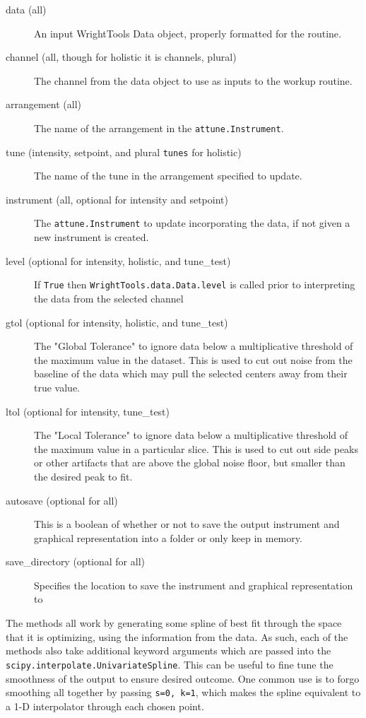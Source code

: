 \begin{description}
\item[data (all)]
An input WrightTools Data object, properly formatted for the routine.
\item[channel (all, though for holistic it is channels, plural)]
The channel from the data object to use as inputs to the workup routine.
\item[arrangement (all)]
The name of the arrangement in the
\texttt{attune.Instrument}.
\item[tune (intensity, setpoint, and plural \texttt{tunes} for
holistic)]
The name of the tune in the arrangement specified to update.
\item[instrument (all, optional for intensity and setpoint)]
The \texttt{attune.Instrument} to update incorporating
the data, if not given a new instrument is created.
\item[level (optional for intensity, holistic, and tune\_test)]
If \texttt{True} then \texttt{WrightTools.data.Data.level} is called
prior to interpreting the data from the selected channel
\item[gtol (optional for intensity, holistic, and tune\_test)]
The "Global Tolerance" to ignore data below a multiplicative threshold
of the maximum value in the dataset. This is used to cut out noise from
the baseline of the data which may pull the selected centers away from
their true value.
\item[ltol (optional for intensity, tune\_test)]
The "Local Tolerance" to ignore data below a multiplicative threshold of
the maximum value in a particular slice. This is used to cut out side
peaks or other artifacts that are above the global noise floor, but
smaller than the desired peak to fit.
\item[autosave (optional for all)]
This is a boolean of whether or not to save the output instrument and
graphical representation into a folder or only keep in memory.
\item[save\_directory (optional for all)]
Specifies the location to save the instrument and graphical
representation to
\end{description}

The methods all work by generating some spline of best fit through the
space that it is optimizing, using the information from the data. As
such, each of the methods also take additional keyword arguments which
are passed into the \texttt{scipy.interpolate.UnivariateSpline}. This
can be useful to fine tune the smoothness of the output to ensure
desired outcome. One common use is to forgo smoothing all together by
passing \texttt{s=0,\ k=1}, which makes the spline equivalent to a 1-D
interpolator through each chosen point.

